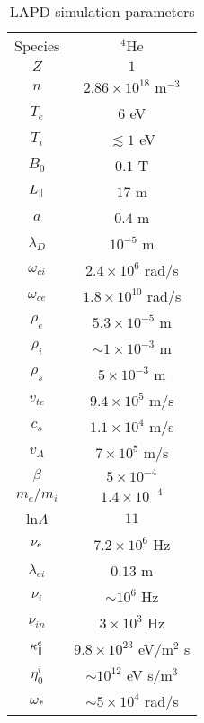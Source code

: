 \begin{table}
\label{parameter_table}
\setlength{\tabcolsep}{60pt}
\begin{tabular}{| c c |}
\hline \hline
Species & $^4$He \\
$Z$ & $1$ \\
$n$ & $2.86 \times 10^{18}$ m$^{-3}$ \\
$T_e$ & $6$ eV \\
$T_i$ & $\lesssim 1$ eV \\
$B_0$ & $0.1$ T \\
$L_\parallel$ & $17$ m \\
$a$ & $0.4$ m \\
$\lambda_D$ & $10^{-5}$ m \\
$\omega_{ci}$ & $2.4 \times 10^6$ rad/s \\
$\omega_{ce}$ & $1.8 \times 10^{10}$ rad/s \\
$\rho_e$ & $ 5.3 \times 10^{-5}$ m \\
$\rho_i$ & $\sim 1 \times 10^{-3}$ m \\
$\rho_s$ & $5 \times 10^{-3}$ m \\
$v_{te}$ & $9.4 \times 10^{5}$ m/s \\
$c_s$ & $1.1 \times 10^4$ m/s \\
$v_A$ & $7 \times 10^5$ m/s \\
$\beta$ & $5 \times 10^{-4}$ \\
$m_e/m_i$ & $1.4 \times 10^{-4}$ \\
ln$\Lambda$ & $11$ \\
$\nu_{e}$ & $7.2 \times 10^6$ Hz \\
$\lambda_{ei}$ & $0.13$ m \\
$\nu_i$ & $\sim 10^6$ Hz \\
$\nu_{in}$ & $3 \times 10^3$ Hz \\
$\kappa_\parallel^e$ & $9.8 \times 10^{23}$ eV/m$^2$ s \\
$\eta_0^i$ & $\sim 10^{12}$ eV s/m$^3$ \\
$\omega_{*}$ & $\sim 5 \times 10^4$ rad/s \\
\hline \hline
\end{tabular}
\caption{LAPD simulation parameters}
\end{table}
